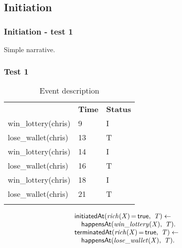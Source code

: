 \documentclass[8pt]{beamer}
\DeclareMathOperator{\val}{=}  %
\def \patsize {}
\def\happensAt{\textsf{\patsize happensAt}}
\def\initiatedAt{\textsf{\patsize initiatedAt}}
\def\terminatedAt{\textsf{\patsize terminatedAt}}
\def\true{\textsf{\patsize true}}
\newenvironment{mysplit}%
  {\arraycolsep 0pt \begin{array}{l}}%
  {\end{array}}
\begin{document}
\subsection{Initiation}
\begin{frame}
    \frametitle{Initiation - test 1}
    \small
    Simple narrative.\\
    \subsubsection{Test 1}
    \begin{minipage}[t][]{0.5\linewidth}
        \begin{table}[t]
            \caption{Event description}
            \begin{center}
                \begin{tabular}{lll}
                    \hline\noalign{\smallskip}
                    \multicolumn{1}{l}{\textbf{Event}} & \multicolumn{1}{c}{\textbf{Time}} & \multicolumn{1}{c}{\textbf{Status}} \\
                    win\_lottery(chris)& 9 & I\\
                    lose\_wallet(chris)& 13 & T\\
                    win\_lottery(chris)& 14 & I\\
                    lose\_wallet(chris)& 16 & T\\
                    win\_lottery(chris)& 18 & I\\
                    lose\_wallet(chris)& 21 & T\\
                    \noalign{\smallskip}
                    \hline
                \end{tabular}
            \end{center}
        \end{table}
    \end{minipage}%
    \begin{minipage}[t]{0.5\linewidth}
        \begin{align*}
            \begin{mysplit}
                \initiatedAt\mathit{(rich(X)\val\true,\ T) \leftarrow}\\
                \quad    \happensAt\mathit{(win\_lottery(X),\ T).}\\
                \terminatedAt\mathit{(rich(X)\val\true,\ T) \leftarrow}\\
                \quad    \happensAt\mathit{(lose\_wallet(X),\ T)}.\\
            \end{mysplit}
        \end{align*}
    \end{minipage}


\end{frame}
\end{document}
